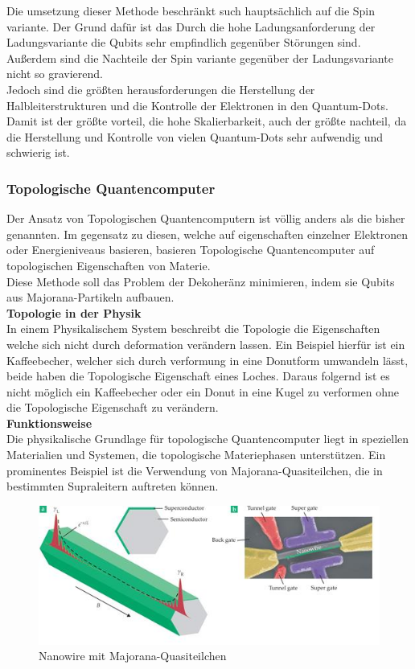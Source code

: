Die umsetzung dieser Methode beschränkt such hauptsächlich auf die Spin variante. Der Grund dafür ist das Durch die hohe Ladungsanforderung der Ladungsvariante die Qubits sehr empfindlich gegenüber Störungen sind.
Außerdem sind die Nachteile der Spin variante gegenüber der Ladungsvariante nicht so gravierend.\\
Jedoch sind die größten herausforderungen die Herstellung der Halbleiterstrukturen und die Kontrolle der Elektronen in den Quantum-Dots.
Damit ist der größte vorteil, die hohe Skalierbarkeit, auch der größte nachteil, da die Herstellung und Kontrolle von vielen Quantum-Dots sehr aufwendig und schwierig ist.\\

\subsubsection{Topologische Quantencomputer}
\label{subsub:topologische_quantencomputer}
Der Ansatz von Topologischen Quantencomputern ist völlig anders als die bisher genannten. Im gegensatz zu diesen, welche auf eigenschaften einzelner Elektronen oder Energieniveaus basieren, basieren Topologische Quantencomputer auf topologischen Eigenschaften von Materie.\\
Diese Methode soll das Problem der Dekoheränz minimieren, indem sie Qubits aus Majorana-Partikeln aufbauen.\\

\textbf{Topologie in der Physik}\\
In einem Physikalischem System beschreibt die Topologie die Eigenschaften welche sich nicht durch deformation verändern lassen.
Ein Beispiel hierfür ist ein Kaffeebecher, welcher sich durch verformung in eine Donutform umwandeln lässt, beide haben die Topologische Eigenschaft eines Loches.
Daraus folgernd ist es nicht möglich ein Kaffeebecher oder ein Donut in eine Kugel zu verformen ohne die Topologische Eigenschaft zu verändern.\\

\textbf{Funktionsweise}\\
Die physikalische Grundlage für topologische Quantencomputer liegt in speziellen Materialien und Systemen, die topologische Materiephasen unterstützen.
Ein prominentes Beispiel ist die Verwendung von Majorana-Quasiteilchen, die in bestimmten Supraleitern auftreten können.\\

\begin{figure}[H]
    \centering
    \includegraphics[width=0.75\linewidth]{img/Majorana.png}
    \caption{Nanowire mit Majorana-Quasiteilchen}
    \label{fig:Majorana}
\end{figure}

